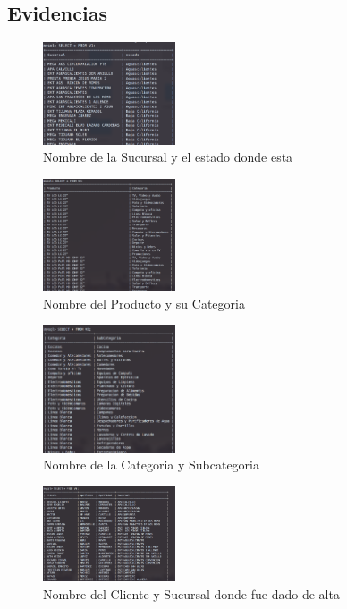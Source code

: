 \documentclass[12pt, fleqn]{article}                             %
\begin{document}
    \subsection{Evidencias}

        \begin{figure}[ht!]
            \centering
            \includegraphics[width=0.35\textwidth]{BD5Reporte1}
            \caption{Nombre de la Sucursal y el estado donde esta}
        \end{figure}

        \begin{figure}[ht!]
            \centering
            \includegraphics[width=0.35\textwidth]{BD5Reporte2}
            \caption{Nombre del Producto y su Categoria}
        \end{figure}


        \begin{figure}[ht!]
            \centering
            \includegraphics[width=0.35\textwidth]{BD5Reporte3}
            \caption{Nombre de la Categoria y Subcategoria}
        \end{figure}

        \begin{figure}[ht!]
            \centering
            \includegraphics[width=0.35\textwidth]{BD5Reporte4}
            \caption{Nombre del Cliente y Sucursal donde fue dado de alta}
        \end{figure}
\end{document}
